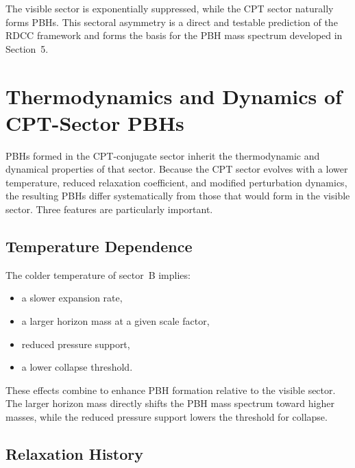 \documentclass[11pt,a4paper]{article}
\begin{document}
The visible sector is exponentially suppressed, while the CPT sector naturally forms PBHs.
This sectoral asymmetry is a direct and testable prediction of the RDCC framework and forms
the basis for the PBH mass spectrum developed in Section~5.


\section{Thermodynamics and Dynamics of CPT-Sector PBHs}

PBHs formed in the CPT-conjugate sector inherit the thermodynamic and dynamical properties
of that sector. Because the CPT sector evolves with a lower temperature, reduced relaxation
coefficient, and modified perturbation dynamics, the resulting PBHs differ systematically from
those that would form in the visible sector. Three features are particularly important.


\subsection{Temperature Dependence}

The colder temperature of sector~B implies:

\begin{itemize}
\item a slower expansion rate,
\item a larger horizon mass at a given scale factor,
\item reduced pressure support,
\item a lower collapse threshold.
\end{itemize}

These effects combine to enhance PBH formation relative to the visible sector. The larger
horizon mass directly shifts the PBH mass spectrum toward higher masses, while the reduced
pressure support lowers the threshold for collapse.


\subsection{Relaxation History}
\end{document}
